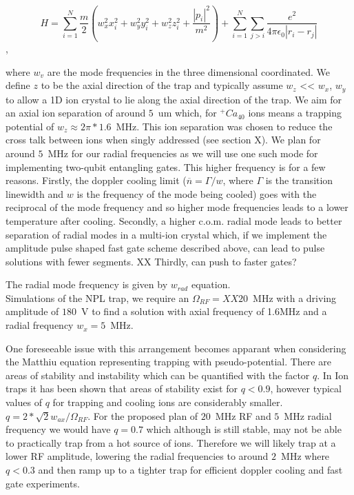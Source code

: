 \documentclass[12pt]{iopart}
\begin{document}
$$ H = \sum_{i=1}^N \frac{m}{2}(w_x^2x_i^2 + w_y^2y_i^2 + w_z^2z_i^2 + \frac{|p_i|^2}{m^2}) + \sum_{i=1}^N\sum_{j>i}\frac{e^2}{4\pi\epsilon_0|r_i - r_j|}$$,

where $w_v$ are the mode frequencies in the three dimensional
coordinated. We define $z$ to be the axial direction of the trap and
typically assume $w_z$ << $w_x$, $w_y$ to allow a 1D ion crystal to
lie along the axial direction of the trap. We aim for an axial ion
separation of around $5$~um which, for $^+Ca_{40}$ ions means a
trapping potential of $w_z \approx 2\pi * 1.6$~MHz. This ion
separation was chosen to reduce the cross talk between ions when
singly addressed (see section X). We plan for around $5$~MHz for our
radial frequencies as we will use one such mode for implementing
two-qubit entangling gates. This higher frequency is for a few
reasons. Firstly, the doppler cooling limit
($\overline{n} = \Gamma/w$, where $\Gamma$ is the transition linewidth
and $w$ is the frequency of the mode being cooled) goes with the
reciprocal of the mode frequency and so higher mode frequencies leads
to a lower temperature after cooling. Secondly, a higher c.o.m. radial
mode leads to better separation of radial modes in a multi-ion crystal
which, if we implement the amplitude pulse shaped fast gate scheme
described above, can lead to pulse solutions with fewer segments. XX
Thirdly, can push to faster gates?

The radial mode frequency is given by
$w_{rad}$ equation. \\
Simulations of the NPL trap,
we require an $\Omega_{RF} = XX20$~MHz with a driving amplitude of
$180$~V to find a solution with axial frequency of 1.6MHz and a radial
frequency $w_x = 5$~MHz.

One foreseeable issue with this arrangement becomes apparant when
considering the Matthiu equation representing trapping with
pseudo-potential. There are areas of stability and instability which
can be quantified with the factor $q$. In Ion traps it has been shown
that areas of stability exist for $q<0.9$, however typical values of
$q$ for trapping and cooling ions are considerably smaller.
$q = 2*\sqrt{2}w_{ax}/\Omega_{RF}$.
For the proposed plan of $20$~MHz RF and $5$~MHz radial frequency we
would have $q = 0.7$ which although is still stable, may not be able
to practically trap from a hot source of ions. Therefore we will
likely trap at a lower RF amplitude, lowering the radial frequencies
to around $2$~MHz where $q<0.3$ and then ramp up to a tighter trap for
efficient doppler cooling and fast gate experiments.
\end{document}

